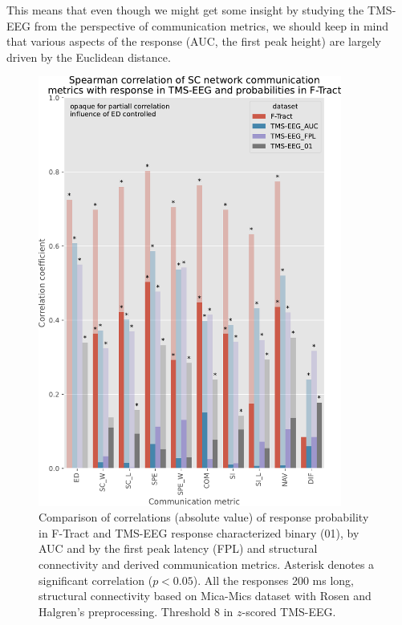 This means that even though we might get some insight by studying the TMS-EEG from the perspective of communication metrics, we should keep in mind that various aspects of the response (AUC, the first peak height) are largely driven by the Euclidean distance. 

\begin{figure}
  \begin{center}
    \includegraphics[width=0.89\textwidth]{images/nootebook_generated/tmseeg_ftract_comparison_results/200ms/Spearman_correlation_of_SC_network_communication_metrics_with_response_in_TMS-EEG_and_probabilities_in_F-Tract.pdf}
  \end{center}
  \caption[Comparison of correlations for F-Tract and TMS-EEG]{Comparison of correlations (absolute value) of response probability in F-Tract and TMS-EEG response characterized binary (01), by AUC and by the first peak latency (FPL) and structural connectivity and derived communication metrics. Asterisk denotes a significant correlation ($p<0.05$). All the responses 200 ms long, structural connectivity based on Mica-Mics dataset with Rosen and Halgren's preprocessing. Threshold 8 in $z$-scored TMS-EEG.}
  \label{fig:compare-correlations_F-Tract-TMS}
\end{figure}

